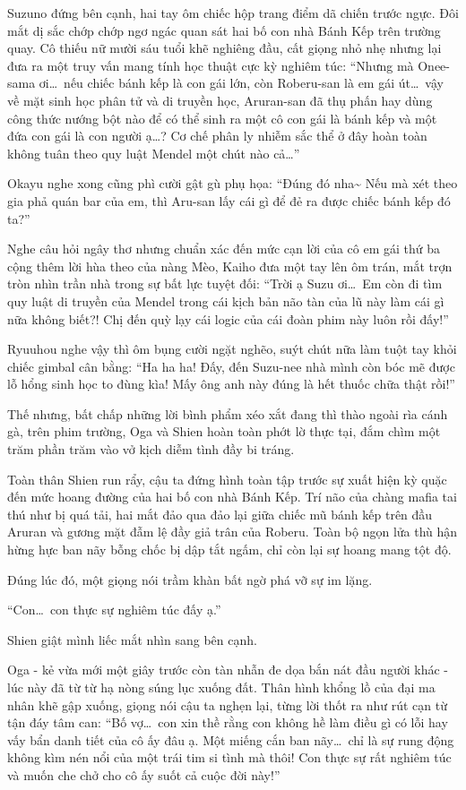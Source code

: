 \documentclass[../main.tex]{subfiles}
\begin{document}
Suzuno đứng bên cạnh, hai tay ôm chiếc hộp trang điểm dã chiến trước ngực. Đôi mắt dị sắc chớp chớp ngơ ngác quan sát hai bố con nhà Bánh Kếp trên trường quay. Cô thiếu nữ mười sáu tuổi khẽ nghiêng đầu, cất giọng nhỏ nhẹ nhưng lại đưa ra một truy vấn mang tính học thuật cực kỳ nghiêm túc: ``Nhưng mà Onee-sama ơi\dots\ nếu chiếc bánh kếp là con gái lớn, còn Roberu-san là em gái út\dots\ vậy về mặt sinh học phân tử và di truyền học, Aruran-san đã thụ phấn hay dùng công thức nướng bột nào để có thể sinh ra một cô con gái là bánh kếp và một đứa con gái là con người ạ\dots? Cơ chế phân ly nhiễm sắc thể ở đây hoàn toàn không tuân theo quy luật Mendel một chút nào cả\dots''

Okayu nghe xong cũng phì cười gật gù phụ họa: ``Đúng đó nha\~{} Nếu mà xét theo gia phả quán bar của em, thì Aru-san lấy cái gì để đẻ ra được chiếc bánh kếp đó ta?''

Nghe câu hỏi ngây thơ nhưng chuẩn xác đến mức cạn lời của cô em gái thứ ba cộng thêm lời hùa theo của nàng Mèo, Kaiho đưa một tay lên ôm trán, mắt trợn tròn nhìn trần nhà trong sự bất lực tuyệt đối: ``Trời ạ Suzu ơi\dots\ Em còn đi tìm quy luật di truyền của Mendel trong cái kịch bản não tàn của lũ này làm cái gì nữa không biết?! Chị đến quỳ lạy cái logic của cái đoàn phim này luôn rồi đấy!''

Ryuuhou nghe vậy thì ôm bụng cười ngặt nghẽo, suýt chút nữa làm tuột tay khỏi chiếc gimbal cân bằng: ``Ha ha ha! Đấy, đến Suzu-nee nhà mình còn bóc mẽ được lỗ hổng sinh học to đùng kìa! Mấy ông anh này đúng là hết thuốc chữa thật rồi!''

Thế nhưng, bất chấp những lời bình phẩm xéo xắt đang thì thào ngoài rìa cánh gà, trên phim trường, Oga và Shien hoàn toàn phớt lờ thực tại, đắm chìm một trăm phần trăm vào vở kịch diễm tình đầy bi tráng.

Toàn thân Shien run rẩy, cậu ta đứng hình toàn tập trước sự xuất hiện kỳ quặc đến mức hoang đường của hai bố con nhà Bánh Kếp. Trí não của chàng mafia tai thú như bị quá tải, hai mắt đảo qua đảo lại giữa chiếc mũ bánh kếp trên đầu Aruran và gương mặt đẫm lệ đầy giả trân của Roberu. Toàn bộ ngọn lửa thù hận hừng hực ban nãy bỗng chốc bị dập tắt ngấm, chỉ còn lại sự hoang mang tột độ.

Đúng lúc đó, một giọng nói trầm khàn bất ngờ phá vỡ sự im lặng.

``Con\dots\ con thực sự nghiêm túc đấy ạ.''

Shien giật mình liếc mắt nhìn sang bên cạnh.

Oga - kẻ vừa mới một giây trước còn tàn nhẫn đe dọa bắn nát đầu người khác - lúc này đã từ từ hạ nòng súng lục xuống đất. Thân hình khổng lồ của đại ma nhân khẽ gập xuống, giọng nói cậu ta nghẹn lại, từng lời thốt ra như rút cạn từ tận đáy tâm can: ``Bố vợ\dots\ con xin thề rằng con không hề làm điều gì có lỗi hay vấy bẩn danh tiết của cô ấy đâu ạ. Một miếng cắn ban nãy\dots\ chỉ là sự rung động không kìm nén nổi của một trái tim si tình mà thôi! Con thực sự rất nghiêm túc và muốn che chở cho cô ấy suốt cả cuộc đời này!''
\end{document}
